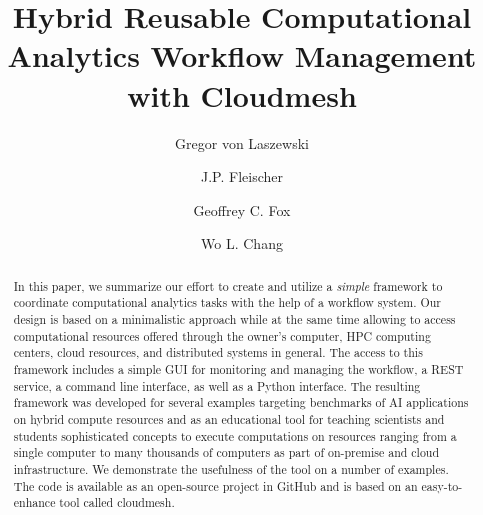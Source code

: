 \title{Hybrid Reusable Computational Analytics Workflow Management with Cloudmesh}

% 

\author{Gregor von Laszewski}

\author{J.P. Fleischer}

\author{Geoffrey C. Fox}

\author{Wo L. Chang}

\renewcommand{\shortauthors}{von Laszewski, et al.}

\begin{abstract}

% 


 In this paper, we summarize our effort to create and utilize a {\em
 simple} framework to coordinate computational analytics tasks with
 the help of a workflow system. Our design is based on a minimalistic
 approach while at the same time allowing to access computational
 resources offered through the owner's computer, HPC computing
 centers, cloud resources, and distributed systems in general. The
 access to this framework includes a simple GUI for monitoring and
 managing the workflow, a REST service, a command line interface, as
 well as a Python interface. The resulting framework was developed for
 several examples targeting benchmarks of AI applications on hybrid
 compute resources and as an educational tool for teaching scientists
 and students sophisticated concepts to execute computations on
 resources ranging from a single computer to many thousands of
 computers as part of on-premise and cloud infrastructure. We
 demonstrate the usefulness of the tool on a number of examples. The
 code is available as an open-source project in GitHub and is based on
 an easy-to-enhance tool called cloudmesh.
 
\end{abstract}


